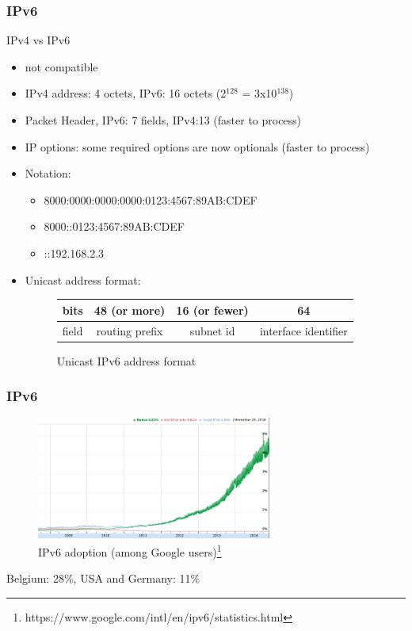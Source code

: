   \begin{frame}
    \frametitle{IPv6}
    \begin{center}IPv4 vs IPv6 \end{center}
    \begin{itemize}
      \item not compatible \pause
      \item IPv4 address: 4 octets, IPv6: 16 octets (2$^{128}$ = 3x10$^{138}$) \pause
      \item Packet Header, IPv6: 7 fields, IPv4:13 (faster to process) \pause
      \item IP options: some required options are now optionals (faster to process) \pause
      \item Notation:
        \begin{itemize}
          \item 8000:0000:0000:0000:0123:4567:89AB:CDEF \pause
          \item 8000::0123:4567:89AB:CDEF \pause
          \item ::192.168.2.3
        \end{itemize}
      \pause
      \item Unicast address format:
      \begin{figure}
        \centering
        \begin{tabular}{l|c|c|c}
          bits & 48 (or more) & 16 (or fewer) & 64 \\ \hline
          field & routing prefix & subnet id & interface identifier \\
        \end{tabular}
        \caption{Unicast IPv6 address format}
        \label{fig:uni-ipv6-address}
      \end{figure}
    \end{itemize}
  \end{frame}

  \begin{frame}
    \frametitle{IPv6}
    \begin{figure}[t]
      \centering
      \includegraphics[height=4cm]{./imgs/2014-11-29-IPv6-adoption.png}
      \caption{IPv6 adoption (among Google users)\footnote{https://www.google.com/intl/en/ipv6/statistics.html}}
      \label{fig:ipv6-adoption}
    \end{figure}
    Belgium: 28\%, USA and Germany: 11\%
  \end{frame}


